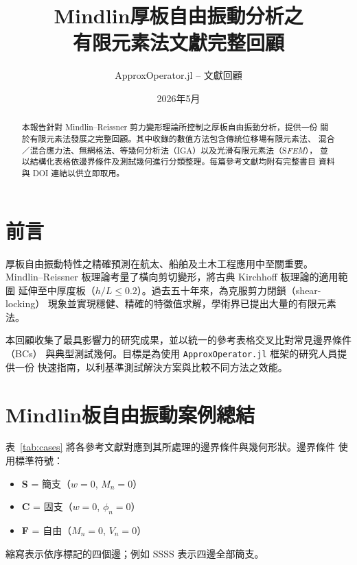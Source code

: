 \documentclass[a4paper,10pt]{article}
\title{\textbf{Mindlin厚板自由振動分析之\\有限元素法文獻完整回顧}}
\author{ApproxOperator.jl -- 文獻回顧}
\date{2026年5月}
\begin{document}
\maketitle

\begin{abstract}
本報告針對 Mindlin--Reissner 剪力變形理論所控制之厚板自由振動分析，提供一份
關於有限元素法發展之完整回顧。其中收錄的數值方法包含傳統位移場有限元素法、
混合／混合應力法、無網格法、等幾何分析法（IGA）以及光滑有限元素法（S\textit{FEM}），
並以結構化表格依邊界條件及測試幾何進行分類整理。每篇參考文獻均附有完整書目
資料與 DOI 連結以供立即取用。
\end{abstract}

\section{前言}
厚板自由振動特性之精確預測在航太、船舶及土木工程應用中至關重要。
Mindlin--Reissner 板理論考量了橫向剪切變形，將古典 Kirchhoff 板理論的適用範圍
延伸至中厚度板（$h/L \leq 0.2$）。過去五十年來，為克服剪力閉鎖（shear-locking）
現象並實現穩健、精確的特徵值求解，學術界已提出大量的有限元素法。

本回顧收集了最具影響力的研究成果，並以統一的參考表格交叉比對常見邊界條件（BCs）
與典型測試幾何。目標是為使用 \texttt{ApproxOperator.jl} 框架的研究人員提供一份
快速指南，以利基準測試解決方案與比較不同方法之效能。

\section{Mindlin板自由振動案例總結}
\label{sec:table}

表~\ref{tab:cases} 將各參考文獻對應到其所處理的邊界條件與幾何形狀。邊界條件
使用標準符號：
\begin{itemize}
    \itemsep0em
    \item \textbf{S} = 簡支（$w=0$, $M_n=0$）
    \item \textbf{C} = 固支（$w=0$, $\phi_n=0$）
    \item \textbf{F} = 自由（$M_n=0$, $V_n=0$）
\end{itemize}
縮寫表示依序標記的四個邊；例如 SSSS 表示四邊全部簡支。
\end{document}
